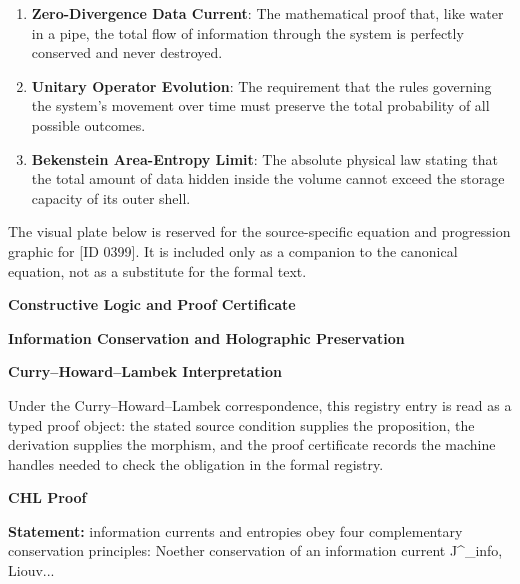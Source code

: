 \begin{enumerate}[leftmargin=1.6em,itemsep=6pt,topsep=4pt]
\item \textbf{Zero-Divergence Data Current}: The mathematical proof that, like water in a pipe, the total flow of information through the system is perfectly conserved and never destroyed.
\item \textbf{Unitary Operator Evolution}: The requirement that the rules governing the system's movement over time must preserve the total probability of all possible outcomes.
\item \textbf{Bekenstein Area-Entropy Limit}: The absolute physical law stating that the total amount of data hidden inside the volume cannot exceed the storage capacity of its outer shell.
\end{enumerate}

\begingroup\footnotesize\sloppy
The visual plate below is reserved for the source-specific equation and progression graphic for [ID 0399]. It is included only as a companion to the canonical equation, not as a substitute for the formal text.
\par\endgroup
\ifTZPDarkEdition
{}
\fi

\clearpage
\begingroup\tzpsupportsetup
\noindent\textbf{\fontsize{10.8pt}{12.8pt}\selectfont [ID 0399] Constructive Logic and Proof Certificate}\par
\noindent\textbf{\fontsize{10pt}{12pt}\selectfont Information Conservation and Holographic Preservation}\par
\vspace{0.45em}
\begingroup
\footnotesize
\setlength{\parskip}{0.22em}
\setlength{\parindent}{0pt}
\noindent\textbf{Curry--Howard--Lambek Interpretation}\par
Under the Curry--Howard--Lambek correspondence, this registry entry is read as a typed proof
object: the stated source condition supplies the proposition, the derivation supplies the
morphism, and the proof certificate records the machine handles needed to check the obligation
in the formal registry.

\vspace{0.45em}
\noindent\textbf{CHL Proof}\par
\textbf{Statement:} information currents and entropies obey four complementary conservation principles:
Noether conservation of an information current J\textasciicircum{}\_info, Liouv...

